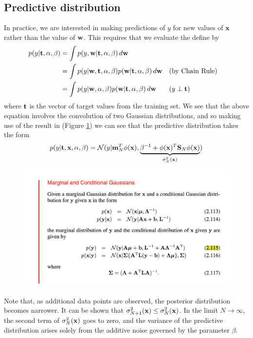 \documentclass[11pt]{article}
\numberwithin{equation}{section}
\begin{document}
\subsection{Predictive distribution}
In practice, we are interested in making predictions of $y$ for new values of $\textbf{x}$ rather than the value of $\textbf{w}$. This requires that we evaluate the  define by
\begin{align}
	p(y|\textbf{t}, \alpha, \beta) &= \int p(y, \textbf{w} | \textbf{t}, \alpha, \beta) \, d\textbf{w} \\
	&= \int p(y|\textbf{w}, \textbf{t}, \alpha, \beta)p(\textbf{w}|\textbf{t}, \alpha, \beta)\, d\textbf{w} &&\text{(by Chain Rule)}\\
	&= \int p(y|\textbf{w}, \alpha, \beta)p(\textbf{w}|\textbf{t}, \alpha, \beta)\, d\textbf{w} &&\text{($y \perp \textbf{t}$)}
\end{align}
where $\textbf{t}$ is the vector of target values from the training set. We see that the above equation involves the convolution of two Gaussian distributions, and so making use of the result in (Figure \ref{p1}) we can see that the predictive distribution takes the form
\begin{align}
	p(y|\textbf{t}, \textbf{x}, \alpha, \beta) = \mathcal{N}(y|\textbf{m}^T_N\phi(\textbf{x}), \underbrace{\beta^{-1} + \phi(\textbf{x})^T\textbf{S}_N\phi(\textbf{x})}_{\sigma^2_N(\textbf{x})})
\end{align}
\begin{figure}[H] 
	\centering
	\includegraphics[scale=0.6]{p1}
	\caption{\label{p1}}
\end{figure}
\remark
Note that, as additional data points are observed, the posterior distribution becomes narrower. It can be shown that $\sigma^2_{N+1}(\textbf{x}) \leq \sigma^2_N(\textbf{x})$. In the limit $N \rightarrow \infty$, the second term of $\sigma^2_N(\textbf{x})$ goes to zero, and the variance of the predictive distribution arises solely from the additive noise governed by the parameter $\beta$.
\end{document}
